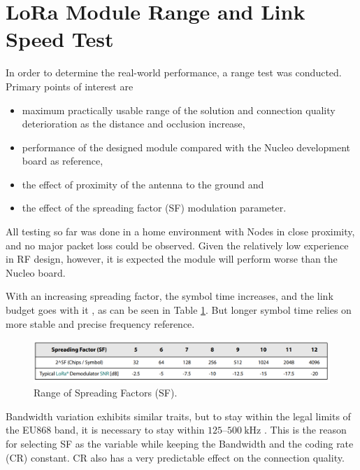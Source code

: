
\section{\label{section:range-test}LoRa Module Range and Link Speed Test}
In order to determine the real-world performance, a range test was conducted. Primary points of interest are
\begin{itemize}
    \item maximum practically usable range of the solution and connection quality deterioration as the distance and occlusion increase,
    \item performance of the designed module compared with the Nucleo development board as reference,
    \item the effect of proximity of the antenna to the ground and
    \item the effect of the spreading factor (SF) modulation parameter.
\end{itemize}

All testing so far was done in a home environment with Nodes in close proximity, and no major packet loss could be observed. Given the relatively low experience in RF design, however, it is expected the module will perform worse than the Nucleo board.

With an increasing spreading factor, the symbol time increases, and the link budget goes with it \cite{semtech_corporation_sx12612_2024}, as can be seen in Table \ref{table:semtech-sf}. But longer symbol time relies on more stable and precise frequency reference. 

\begin{figure}[H]
    \includegraphics[width=\textwidth]{fig/semtech-sf-table.png}
    \caption{\label{table:semtech-sf}Range of Spreading Factors (SF).}
\end{figure}

Bandwidth variation exhibits similar traits, but to stay within the legal limits of the EU868 band, it is necessary to stay within $125\text{--}500~\mathrm{kHz}$ \cite{etsi_short_2018,the_things_network_eu863-870_nodate}. This is the reason for selecting SF as the variable while keeping the Bandwidth and the coding rate (CR) constant. CR also has a very predictable effect on the connection quality.

